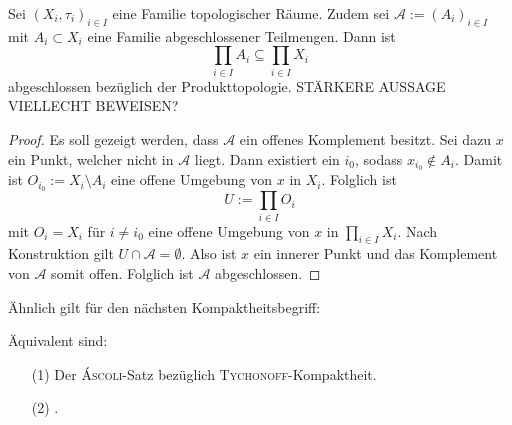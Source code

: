 \begin{prop}
  \label{prop:cartesianclosed}
  Sei $(X_i,\tau_i)_{i \in I}$ eine Familie topologischer Räume. 
  Zudem sei $\mathcal{A} := (A_i)_{i \in I}$ mit  $A_i \subset X_i$ eine Familie abgeschlossener Teilmengen.
  Dann ist 
  \begin{displaymath}
    \prod_{i \in I} A_i \subseteq \prod_{i \in I} X_i
  \end{displaymath}
  abgeschlossen bezüglich der Produkttopologie.
  STÄRKERE AUSSAGE VIELLECHT BEWEISEN?
\end{prop}

\begin{proof}
  Es soll gezeigt werden, dass $\mathcal{A}$ ein offenes Komplement besitzt.
  Sei dazu $x$ ein Punkt, welcher nicht in $\mathcal{A}$ liegt.
  Dann existiert ein $i_0$, sodass $x_{i_0} \not\in A_i$.
  Damit ist $O_{i_0} := X_i \setminus A_i$ eine offene Umgebung von $x$ in $X_i$.
  Folglich ist
  \begin{displaymath}
    U:= \prod_{i \in I} O_i
  \end{displaymath}
  mit $O_i = X_i$ für $i \not= i_0$ eine offene Umgebung von $x$ in $\prod_{i \in I} X_i$.
  Nach Konstruktion gilt $U \cap \mathcal{A} = \emptyset$.
  Also ist $x$ ein innerer Punkt und das Komplement von $\mathcal{A}$ somit offen.
  Folglich ist $\mathcal{A}$ abgeschlossen.
\end{proof}

Ähnlich gilt für den nächsten Kompaktheitsbegriff:

\begin{thm}
  Äquivalent sind:
  \begin{enumerate}
    \item[(1)] Der \textsc{Áscoli}-Satz bezüglich \textsc{\textsc{Tychonoff}}-Kompaktheit.
    \item[(2)] \PIT.
  \end{enumerate}
\end{thm}

